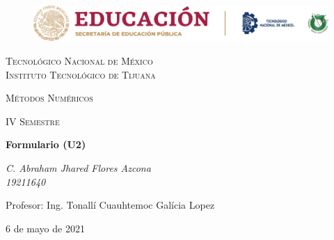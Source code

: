 \documentclass[letterpaper, 12pt]{article}
\begin{document}
    
    \begin{titlepage}
        \begin{figure}[ht]
            \centering
            \includegraphics[width=15cm]{logosITT.png}
        \end{figure}
        \centering
        {\scshape\LARGE Tecnológico Nacional de México\\Instituto Tecnológico de Tijuana\par}
        \vspace{1cm}
        {\scshape\Large Métodos Numéricos\par}
        \vspace{1cm}
        {\scshape\Large IV Semestre\par}
        \vspace{1.5cm}
        {\huge\bfseries Formulario (U2)\par}
        \vspace{2cm}
        {\Large\itshape C. Abraham Jhared Flores Azcona\\19211640\par}
        \vfill
        Profesor: Ing. Tonallí Cuauhtemoc Galícia Lopez\par
        
        \vfill

        {\large 6 de mayo de 2021}
    \end{titlepage}
\end{document}
